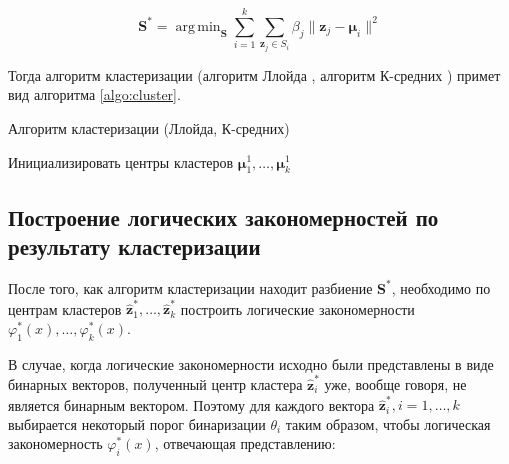 \documentclass[12pt]{article}
\DeclareMathOperator*{\argmin}{arg\,min}
\begin{document}
\begin{equation}\label{eq:quality}
\bm{S}^* =
\argmin_{\bm{S}}
\sum_{i=1}^k \sum_{\bm{z}_j\in S_i} \beta_j \|\bm{z}_j - \bm{\mu}_i\|^2
\end{equation}

Тогда алгоритм кластеризации
(алгоритм Ллойда \cite{lloyd06}, алгоритм К-средних \cite{macqueen67})
примет вид алгоритма \ref{algo:cluster}.

\begin{algorithm}[!htpb]
  \caption{Алгоритм кластеризации (Ллойда, К-средних)}
  \label{algo:cluster}
   {
    Инициализировать центры кластеров
    \(\bm{\mu}_1^1, \dots, \bm{\mu}_k^1\)\;
    \;
  }
\end{algorithm}

\subsection{Построение логических закономерностей по результату кластеризации}
После того, как алгоритм кластеризации находит разбиение
\(\bm{S}^*\), необходимо по центрам кластеров
\(\bm{\hat{z}}_1^*, \dots, \bm{\hat{z}}_k^*\)
построить логические закономерности
\(\varphi_1^*(x), \dots, \varphi_k^*(x)\).

В случае, когда логические закономерности исходно были представлены в
виде бинарных векторов, полученный центр кластера \(\bm{\hat{z}}_i^*\)
уже, вообще говоря, не является бинарным вектором. Поэтому для каждого
вектора \(\bm{\hat{z}}^*_i, i = 1,\dots, k\) выбирается некоторый порог
бинаризации \(\theta_i\) таким образом, чтобы логическая закономерность
\(\varphi_i^*(x)\), отвечающая представлению:
\end{document}
